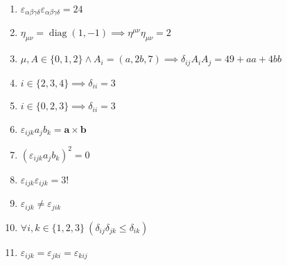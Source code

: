 \documentclass[11pt,a4paper]{article}
\begin{document}
\begin{enumerate}
\item $\displaystyle \varepsilon_{\alpha\beta\gamma\delta}\varepsilon_{\alpha\beta\gamma\delta} = 24$
\item $\displaystyle \eta_{\mu\nu} = \operatorname{diag}(1, -1) \implies \eta^{\mu\nu}\eta_{\mu\nu} = 2$
\item $\displaystyle \mu, A \in \{0, 1, 2\} \land A_{i} = (a, 2 b, 7) \implies \delta_{ij} A_{i} A_{j} = 49 + a a + 4 b b$
\item $\displaystyle i \in \{2, 3, 4\} \implies \delta_{ii} = 3$
\item $\displaystyle i \in \{0, 2, 3\} \implies \delta_{ii} = 3$
\item $\displaystyle \varepsilon_{ijk} a_{j} b_{k} = \mathbf{a} \times \mathbf{b}$
\item $\displaystyle \left( \varepsilon_{ijk} a_{j} b_{k} \right)^{2} = 0$
\item $\displaystyle \varepsilon_{ijk}\varepsilon_{ijk} = 3!$
\item $\displaystyle \varepsilon_{ijk} \neq \varepsilon_{jik}$
\item $\displaystyle \forall i, k \in \{1, 2, 3\}\ \left( \delta_{ij}\delta_{jk} \le \delta_{ik} \right)$
\item $\displaystyle \varepsilon_{ijk} = \varepsilon_{jki} = \varepsilon_{kij}$
\end{enumerate}
\end{document}
